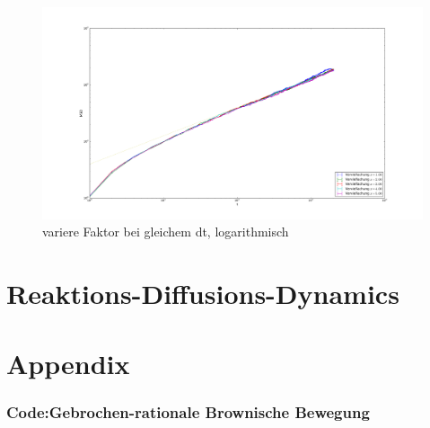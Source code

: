 \documentclass[
  a4paper,BCOR10mm,oneside,
  bibtotoc,idxtotoc,
  headsepline,footsepline,%
  fleqn,openbib
]{scrbook}
\begin{document}
\begin{figure}[h]
\includegraphics[width=\textwidth]{./faktor_variert_bei_dt_1_log.pdf}
\caption{variere Faktor bei gleichem dt, logarithmisch}
 \centering
\end{figure}

\chapter{Reaktions-Diffusions-Dynamics}
\chapter{Appendix}
\subsection{Code:Gebrochen-rationale Brownische Bewegung}


\nocite{}



\end{document}
